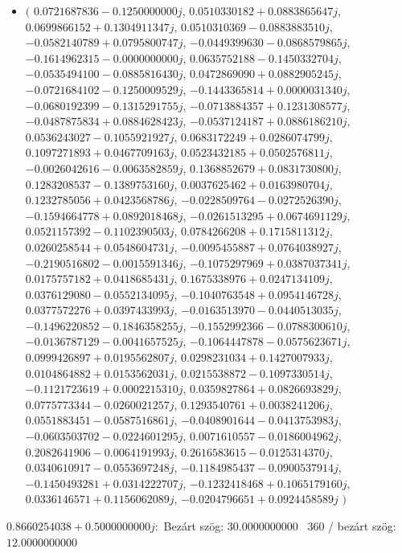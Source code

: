 \documentclass[14pt,a4paper]{article}
\begin{document}
\begin{itemize}
\item
$\big($
$0.0721687836-0.1250000000j$, $0.0510330182+0.0883865647j$, $0.0699866152+0.1304911347j$, $0.0510310369-0.0883883510j$, $-0.0582140789+0.0795800747j$, $-0.0449399630-0.0868579865j$, $-0.1614962315-0.0000000000j$, $0.0635752188-0.1450332704j$, $-0.0535494100-0.0885816430j$, $0.0472869090+0.0882905245j$, $-0.0721684102-0.1250009529j$, $-0.1443365814+0.0000031340j$, $-0.0680192399-0.1315291755j$, $-0.0713884357+0.1231308577j$, $-0.0487875834+0.0884628423j$, $-0.0537124187+0.0886186210j$, $0.0536243027-0.1055921927j$, $0.0683172249+0.0286074799j$, $0.1097271893+0.0467709163j$, $0.0523432185+0.0502576811j$, $-0.0026042616-0.0063582859j$, $0.1368852679+0.0831730800j$, $0.1283208537-0.1389753160j$, $0.0037625462+0.0163980704j$, $0.1232785056+0.0423568786j$, $-0.0228509764-0.0272526390j$, $-0.1594664778+0.0892018468j$, $-0.0261513295+0.0674691129j$, $0.0521157392-0.1102390503j$, $0.0784266208+0.1715811312j$, $0.0260258544+0.0548604731j$, $-0.0095455887+0.0764038927j$, $-0.2190516802-0.0015591346j$, $-0.1075297969+0.0387037341j$, $0.0175757182+0.0418685431j$, $0.1675338976+0.0247134109j$, $0.0376129080-0.0552134095j$, $-0.1040763548+0.0954146728j$, $0.0377572276+0.0397433993j$, $-0.0163513970-0.0440513035j$, $-0.1496220852-0.1846358255j$, $-0.1552992366-0.0788300610j$, $-0.0136787129-0.0041657525j$, $-0.1064447878-0.0575623671j$, $0.0999426897+0.0195562807j$, $0.0298231034+0.1427007933j$, $0.0104864882+0.0153562031j$, $0.0215538872-0.1097330514j$, $-0.1121723619+0.0002215310j$, $0.0359827864+0.0826693829j$, $0.0775773344-0.0260021257j$, $0.1293540761+0.0038241206j$, $0.0551883451-0.0587516861j$, $-0.0408901644-0.0413753983j$, $-0.0603503702-0.0224601295j$, $0.0071610557-0.0186004962j$, $0.2082641906-0.0064191993j$, $0.2616583615-0.0125314370j$, $0.0340610917-0.0553697248j$, $-0.1184985437-0.0900537914j$, $-0.1450493281+0.0314222707j$, $-0.1232418468+0.1065179160j$, $0.0336146571+0.1156062089j$, $-0.0204796651+0.0924458589j$
$\big)$
\end{itemize}
$0.8660254038+0.5000000000j$:\
Bezárt szög: $30.0000000000$ \
360 / bezárt szög: $12.0000000000$\
\end{document}
